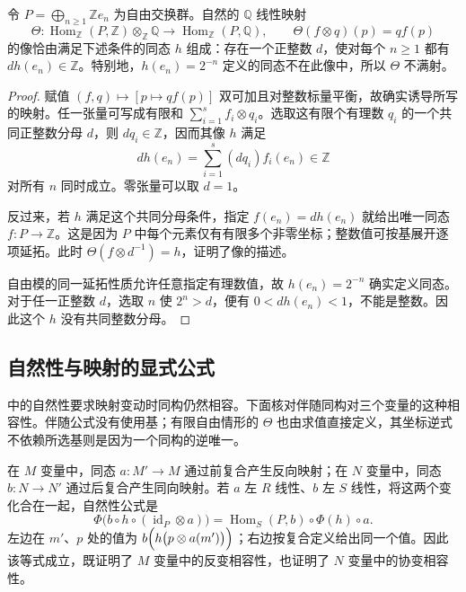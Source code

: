 \begin{proposition}\label{b2:prop:infinite-free-hom-tensor}
	令 \(P=\bigoplus_{n\geq1}\mathbb Ze_n\) 为自由交换群。自然的 \(\mathbb Q\) 线性映射
	\[
		\Theta:\operatorname{Hom}_{\mathbb Z}(P,\mathbb Z) \otimes_{\mathbb Z}\mathbb Q \longrightarrow\operatorname{Hom}_{\mathbb Z}(P,\mathbb Q), \qquad \Theta(f\otimes q)(p)=qf(p)
	\]
	的像恰由满足下述条件的同态 \(h\) 组成：存在一个正整数 \(d\)，使对每个 \(n\geq1\) 都有 \(dh(e_n)\in\mathbb Z\)。特别地，\(h(e_n)=2^{-n}\) 定义的同态不在此像中，所以 \(\Theta\) 不满射。
\end{proposition}
\begin{proof}
	赋值 \((f,q)\mapsto[p\mapsto qf(p)]\) 双可加且对整数标量平衡，故确实诱导所写的映射。任一张量可写成有限和 \(\sum_{i=1}^s f_i\otimes q_i\)。选取这有限个有理数 \(q_i\) 的一个共同正整数分母 \(d\)，则 \(dq_i\in\mathbb Z\)，因而其像 \(h\) 满足
	\[
		dh(e_n)=\sum_{i=1}^s(dq_i)f_i(e_n)\in\mathbb Z
	\]
	对所有 \(n\) 同时成立。零张量可以取 \(d=1\)。

	反过来，若 \(h\) 满足这个共同分母条件，指定 \(f(e_n)=dh(e_n)\) 就给出唯一同态 \(f:P\to\mathbb Z\)。这是因为 \(P\) 中每个元素仅有有限多个非零坐标；整数值可按基展开逐项延拓。此时 \(\Theta(f\otimes d^{-1})=h\)，证明了像的描述。

	自由模的同一延拓性质允许任意指定有理数值，故 \(h(e_n)=2^{-n}\) 确实定义同态。对于任一正整数 \(d\)，选取 \(n\) 使 \(2^n>d\)，便有 \(0<dh(e_n)<1\)，不能是整数。因此这个 \(h\) 没有共同整数分母。
\end{proof}

\subsection{自然性与映射的显式公式}
\label{b2:subsec:0603:02}

中的自然性要求映射变动时同构仍然相容。下面核对伴随同构对三个变量的这种相容性。伴随公式没有使用基；有限自由情形的 \(\Theta\) 也由求值直接定义，其坐标逆式不依赖所选基则是因为一个同构的逆唯一。

\ProseParagraphBreak
在 \(M\) 变量中，同态 \(a:M'\to M\) 通过前复合产生反向映射；在 \(N\) 变量中，同态 \(b:N\to N'\) 通过后复合产生同向映射。若 \(a\) 左 \(R\) 线性、\(b\) 左 \(S\) 线性，将这两个变化合在一起，自然性公式是
\begin{equation}\label{b2:eq:tensor-adjunction-naturality}
	\Phi\bigl(b\circ h\circ(\operatorname{id}_P\otimes a)\bigr) =\operatorname{Hom}_S(P,b)\circ\Phi(h)\circ a.
\end{equation}
左边在 \(m'\)、\(p\) 处的值为 \(b\Bigl(h\bigl(p\otimes a(m')\bigr)\Bigr)\)；右边按复合定义给出同一个值。因此该等式成立，既证明了 \(M\) 变量中的反变相容性，也证明了 \(N\) 变量中的协变相容性。

